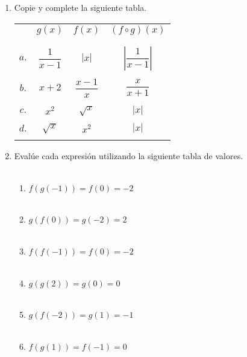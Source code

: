 \begin{enumerate}
\item  Copie y complete la siguiente tabla.
\begin{center}
    \begin{tabular}{cccc}
	&$g(x)$&$f(x)$&$(f\circ g)(x)$\\\\
	\hline\\
	$a.$&$\dfrac{1}{x-1}$&$|x|$&$\left| \dfrac{1}{x-1}\right|$\\\\
	$b.$&$x+2$&$\dfrac{x-1}{x}$&$\dfrac{x}{x+1}$\\\\
	$c.$&$x^2$&$\sqrt{x}$&$|x|$\\\\
	$d.$&$\sqrt{x}$&$x^2$&$|x|$\\\\
    \end{tabular}
\end{center}

\item Evalúe cada expresión utilizando la siguiente tabla de valores.\\\\
\begin{enumerate}[\bfseries a.]

    \item $f(g(-1)) = f(0) = -2$\\\\

    \item $g(f(0)) = g(-2) = 2$\\\\ 

    \item $f(f(-1)) = f(0) = -2$\\\\

    \item $g(g(2)) = g(0) = 0$\\\\

    \item $g(f(-2)) = g(1) = -1$\\\\

    \item $f(g(1)) = f(-1) = 0$\\\\


\end{enumerate}
\end{enumerate}
